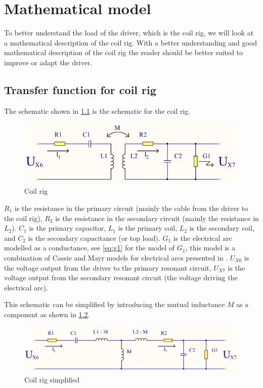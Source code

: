 \chapter{Mathematical model}
\label{sec:math}

To better understand the load of the driver, which is the coil rig, we will look at a mathematical description of the coil rig. With a better understanding and good mathematical description of the coil rig the reader should be better suited to improve or adapt the driver.

\section{Transfer function for coil rig}
\label{sec:coilrigmath}

The schematic shown in \cref{fig:spolerigg11} is the schematic for the coil rig.

\begin{figure}[H]
    \centering
    \includegraphics[width=\textwidth]{Skjema/Spolerigg1_r.pdf}
    \caption{Coil rig}
    \label{fig:spolerigg11}
\end{figure}

$R_1$ is the resistance in the primary circuit (mainly the cable from the driver to the coil rig), $R_2$ is the resistance in the secondary circuit (mainly the resistance in $L_2$). $C_1$ is the primary capacitor, $L_1$ is the primary coil, $L_2$ is the secondary coil, and $C_2$ is the secondary capacitance (or top load). $G_1$ is the electrical arc modelled as a conductance, see \cref{eq:g1} for the model of $G_1$, this model is a combination of Cassie \citep{cassie} and Mayr \citep{mayr} models for electrical arcs presented in \citep{575670}. $U_{X6}$ is the voltage output from the driver to the primary resonant circuit, $U_{X7}$ is the voltage output from the secondary resonant circuit (the voltage driving the electrical arc).

This schematic can be simplified by introducing the mutual inductance $M$ as a component as shown in \cref{fig:spolerigg2}.

\begin{figure}[H]
    \centering
    \includegraphics[width=\textwidth]{Skjema/Spolerigg2_r.pdf}
    \caption{Coil rig simplified}
    \label{fig:spolerigg2}
\end{figure}


